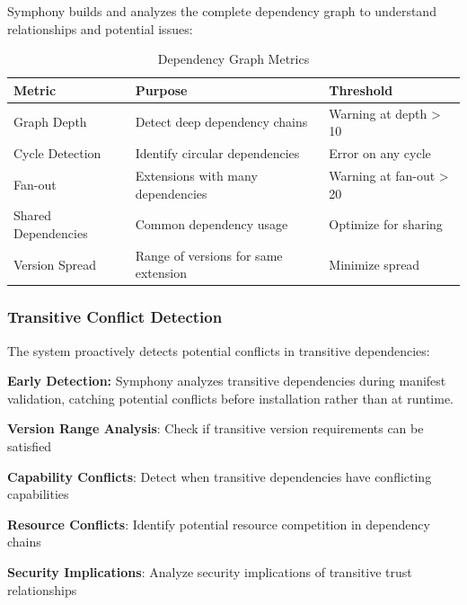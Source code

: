 Symphony builds and analyzes the complete dependency graph to understand relationships and potential issues:

\begin{table}[h]
\centering
\caption{Dependency Graph Metrics}
\label{tab:dependency-graph-metrics}
\begin{tabular}{@{}lll@{}}
\toprule
\textbf{Metric} & \textbf{Purpose} & \textbf{Threshold} \\
\midrule
Graph Depth & Detect deep dependency chains & Warning at depth > 10 \\
Cycle Detection & Identify circular dependencies & Error on any cycle \\
Fan-out & Extensions with many dependencies & Warning at fan-out > 20 \\
Shared Dependencies & Common dependency usage & Optimize for sharing \\
Version Spread & Range of versions for same extension & Minimize spread \\
\bottomrule
\end{tabular}
\end{table}

\subsubsection{Transitive Conflict Detection}
\label{subsubsec:transitive-conflict-detection}

The system proactively detects potential conflicts in transitive dependencies:

\begin{successbox}
\textbf{Early Detection:} Symphony analyzes transitive dependencies during manifest validation, catching potential conflicts before installation rather than at runtime.
\end{successbox}

\begin{compactlist}
\item \textbf{Version Range Analysis}: Check if transitive version requirements can be satisfied
\item \textbf{Capability Conflicts}: Detect when transitive dependencies have conflicting capabilities
\item \textbf{Resource Conflicts}: Identify potential resource competition in dependency chains
\item \textbf{Security Implications}: Analyze security implications of transitive trust relationships
\end{compactlist}

